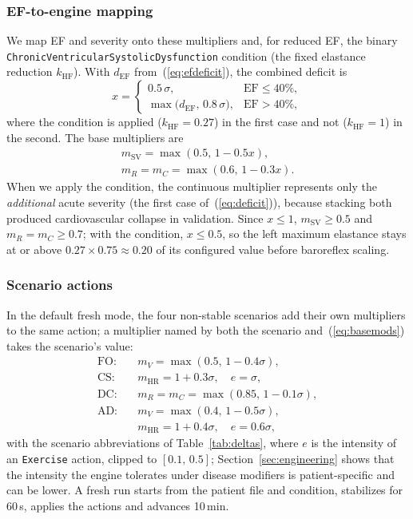 \documentclass[conference]{IEEEtran}
\newcommand{\code}[1]{\texttt{\footnotesize #1}}
\begin{document}
\subsubsection{EF-to-engine mapping}
We map EF and severity onto these multipliers and, for reduced EF, the binary \code{ChronicVentricularSystolicDysfunction} condition (the fixed elastance reduction $k_{\text{HF}}$). With $d_{\text{EF}}$ from~(\ref{eq:efdeficit}), the combined deficit is
\begin{equation}
x=\begin{cases}0.5\,\sigma, & \text{EF}\le40\%,\\ \max\big(d_{\text{EF}},\,0.8\,\sigma\big), & \text{EF}>40\%,\end{cases}
\label{eq:deficit}
\end{equation}
where the condition is applied ($k_{\text{HF}}=0.27$) in the first case and not ($k_{\text{HF}}=1$) in the second. The base multipliers are
\begin{equation}
\begin{gathered}
m_{\text{SV}}=\max(0.5,\,1-0.5x),\\
m_{R}=m_{C}=\max(0.6,\,1-0.3x).
\end{gathered}
\label{eq:basemods}
\end{equation}
When we apply the condition, the continuous multiplier represents only the \emph{additional} acute severity (the first case of~(\ref{eq:deficit})), because stacking both produced cardiovascular collapse in validation. Since $x\le1$, $m_{\text{SV}}\ge0.5$ and $m_R=m_C\ge0.7$; with the condition, $x\le0.5$, so the left maximum elastance stays at or above $0.27\times0.75\approx0.20$ of its configured value before baroreflex scaling.

\subsubsection{Scenario actions}
In the default fresh mode, the four non-stable scenarios add their own multipliers to the same action; a multiplier named by both the scenario and~(\ref{eq:basemods}) takes the scenario's value:
\begin{equation}
\begin{aligned}
\text{FO:}\quad & m_V=\max(0.5,\,1-0.4\sigma),\\
\text{CS:}\quad & m_{\text{HR}}=1+0.3\sigma,\quad e=\sigma,\\
\text{DC:}\quad & m_R=m_C=\max(0.85,\,1-0.1\sigma),\\
\text{AD:}\quad & m_V=\max(0.4,\,1-0.5\sigma),\\
& m_{\text{HR}}=1+0.4\sigma,\quad e=0.6\sigma,
\end{aligned}
\label{eq:scenarioacts}
\end{equation}
with the scenario abbreviations of Table~\ref{tab:deltas}, where $e$ is the intensity of an \code{Exercise} action, clipped to $[0.1,\,0.5]$; Section~\ref{sec:engineering} shows that the intensity the engine tolerates under disease modifiers is patient-specific and can be lower. A fresh run starts from the patient file and condition, stabilizes for 60\,s, applies the actions and advances 10\,min.
\end{document}
